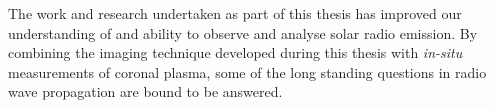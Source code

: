 The work and research undertaken as part of this thesis has improved our understanding of and ability to observe and analyse solar radio emission. By combining the imaging technique developed during this thesis with \textit{in-situ} measurements of coronal plasma, some of the long standing questions in radio wave propagation are bound to be answered. 














